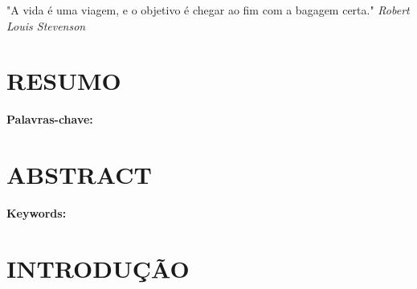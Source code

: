 \documentclass[12pt, a4paper]{article}
\begin{document}
        \null\vfil
        \begin{changemargin}{5cm}{0cm} 
            \justifying
            \hspace{1.5cm} "A vida é uma viagem, e o objetivo é chegar ao fim com a bagagem certa." \textit{Robert Louis Stevenson}
        \end{changemargin}
        \pagebreak

        \section*{\fontsize{12}{14} \selectfont RESUMO}
        

        \vspace{1cm}

        \noindent \textbf{Palavras-chave:} 

        \pagebreak

        \section*{\fontsize{12}{14} \selectfont \center ABSTRACT}
        

        \vspace{1cm}
        \noindent \textbf{Keywords:} 
        \pagebreak
    
        \listoffigures
        \thispagestyle{empty} %
        \pagebreak

        \pagebreak

        \listoftables
        \thispagestyle{empty} %
        \pagebreak

        \pagebreak

        \pagebreak

        \doublespacing
        \tableofcontents
        \onehalfspacing
        \thispagestyle{empty} %
        \pagebreak

        \thispagestyle{empty}
        \null\vfil
        \pagebreak

    \pagestyle{myheadings} %

    \section{INTRODUÇÃO}
        
\end{document}
